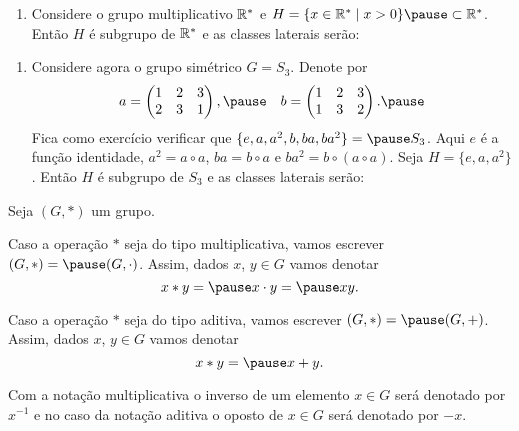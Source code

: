 \documentclass{beamer}
\begin{document}
    \begin{frame}
        \begin{exemplos}
            \begin{enumerate}[label={\roman*})]
                \conti
                \item Considere o grupo multiplicativo $\mathbb{R}^*$ \pause e $H = \{ x \in \real^* \mid x > 0\} \pause \subset \real^*$. \pause Então $H$ é subgrupo de $\mathbb{R}^*$ \pause e as classes laterais serão:
                \seti
            \end{enumerate}
        \end{exemplos}
    \end{frame}

    \begin{frame}
        \begin{exemplos}
            \begin{enumerate}[label={\roman*})]
                \conti
                \item Considere agora o grupo simétrico $G = S_3$. \pause Denote por \pause
                \[
                    a = \begin{pmatrix}
                        1 & 2 & 3\\2 & 3 & 1
                    \end{pmatrix}, \pause \quad
                    b = \begin{pmatrix}
                        1 & 2 & 3\\1 & 3 & 2
                    \end{pmatrix}. \pause
                \]
                Fica como exercício verificar que $\{e, a, a^2 , b, ba, ba^2\} = \pause S_3$. \pause Aqui $e$ é a função identidade, \pause $a^2 = a \circ a$, \pause $ba = b \circ a$ e \pause $ba^2 = b\circ(a\circ a)$. \pause Seja $H = \{e, a , a^2\}$. \pause Então $H$ é subgrupo de $S_3$ \pause e as classes laterais serão:
            \end{enumerate}
        \end{exemplos}
    \end{frame}

    \begin{frame}
        Seja $(G, *)$ um grupo. \pause

        Caso a operação $*$ seja do tipo multiplicativa, vamos escrever $(G, *) = \pause (G, \cdot)$. \pause Assim, dados $x$, $y \in G$ vamos denotar\pause
        \[
            x * y = \pause x \cdot y = \pause xy.
        \]

        Caso a operação $*$ seja do tipo aditiva, vamos escrever $(G, *) = \pause (G, +)$. \pause Assim, dados $x$, $y \in G$ vamos denotar\pause
        \[
            x * y = \pause x + y.
        \]

        Com a notação multiplicativa \pause o inverso de um elemento $x \in G$ \pause será denotado por $x^{-1}$ \pause e no caso da notação aditiva \pause o oposto de $x \in G$ \pause será denotado por $-x$.
    \end{frame}
\end{document}

